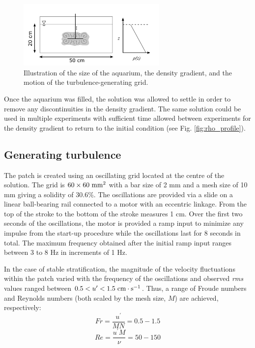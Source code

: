 \documentclass{piv13-abstract}
\newcommand{\unit}[1]{\ensuremath{\, \mathrm{\hspace{0.5mm}#1}}}
\newcommand{\figLabel}{Fig. }
\begin{document}
\begin{figure}[ht]
\centering
\includegraphics[width=0.65\textwidth]{figures/exp_schematic.pdf}
\caption{Illustration of the size of the aquarium, the density gradient, and the motion of the turbulence-generating grid. \label{fig:exp_schematic}}
\end{figure}

Once the aquarium was filled, the solution was allowed to settle in order to remove any discontinuities in the density gradient. The same solution could be used in multiple experiments with sufficient time allowed between experiments for the density gradient to return to the initial condition (see \figLabel\ref{fig:rho_profile}).

\subsection{Generating turbulence}

The patch is created using an oscillating grid located at the centre of the solution. The grid is $60\times60\unit{mm^2}$ with a bar size of 2 mm and a mesh size of 10 mm giving a solidity of 30.6\%. The oscillations are provided via a slide on a linear ball-bearing rail connected to a motor with an eccentric linkage. From the top of the stroke to the bottom of the stroke measures 1 cm. Over the first two seconds of the oscillations, the motor is provided a ramp input to minimize any impulse from the start-up procedure while the oscillations last for 8 seconds in total. The maximum frequency obtained after the initial ramp input ranges between 3 to 8 Hz in increments of 1 Hz.

In the case of stable stratification, the magnitude of the velocity fluctuations within the patch varied with the frequency of the oscillations and observed \emph{rms} values ranged between $0.5 < u^{\prime} < 1.5 \unit{cm\cdot s^{-1}}$.  Thus, a range of Froude numbers and Reynolds numbers (both scaled by the mesh size, $M$) are achieved, respectively:
\begin{equation}
Fr = \frac{u^{\prime}}{MN} = 0.5 - 1.5 
\end{equation}
\begin{equation}
Re = \frac{u^{\prime}M}{\nu} = 50 - 150
\end{equation}
\end{document}
